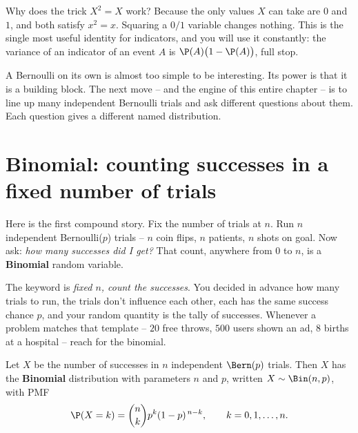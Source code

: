 \begin{whybox}
Why does the trick $X^2 = X$ work? Because the only values $X$ can take are $0$
and $1$, and both satisfy $x^2 = x$. Squaring a $0/1$ variable changes nothing.
This is the single most useful identity for indicators, and you will use it
constantly: the variance of an indicator of an event $A$ is
$\P(A)\bigl(1 - \P(A)\bigr)$, full stop.
\end{whybox}

A Bernoulli on its own is almost too simple to be interesting. Its power is that
it is a building block. The next move -- and the engine of this entire chapter --
is to line up many independent Bernoulli trials and ask different questions about
them. Each question gives a different named distribution.

\section{Binomial: counting successes in a fixed number of trials}
\label{ch07:binomial}

Here is the first compound story. Fix the number of trials at $n$. Run $n$
independent Bernoulli($p$) trials -- $n$ coin flips, $n$ patients, $n$ shots on
goal. Now ask: \emph{how many successes did I get?} That count, anywhere from $0$
to $n$, is a \textbf{Binomial} random variable.

\begin{intuitionbox}
The keyword is \emph{fixed $n$, count the successes}. You decided in advance how
many trials to run, the trials don't influence each other, each has the same
success chance $p$, and your random quantity is the tally of successes. Whenever a
problem matches that template -- $20$ free throws, $500$ users shown an ad, $8$
births at a hospital -- reach for the binomial.
\end{intuitionbox}

\begin{definition}
\label{ch07:def-binomial}
Let $X$ be the number of successes in $n$ independent $\Bern(p)$ trials. Then $X$
has the \textbf{Binomial} distribution with parameters $n$ and $p$, written
$X \sim \Bin(n,p)$, with PMF
\[
  \P(X = k) = \binom{n}{k} p^{k} (1-p)^{\,n-k}, \qquad k = 0, 1, \dots, n.
\]
\end{definition}

